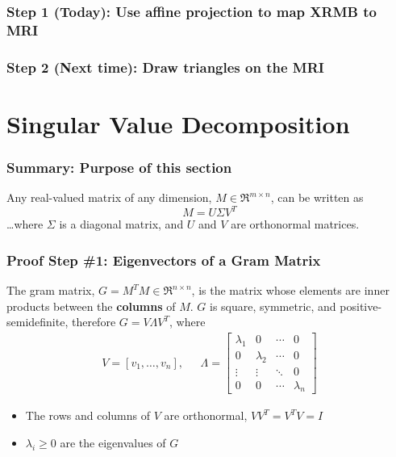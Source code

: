 \documentclass{beamer}
\begin{document}
\begin{frame}
  \frametitle{Step 1 (Today): Use affine projection to map XRMB to MRI}
  \centerline{}
\end{frame}

\begin{frame}
  \frametitle{Step 2 (Next time): Draw triangles on the MRI}
  \centerline{}
\end{frame}

\section{Singular Value Decomposition}
\setcounter{subsection}{1}

\begin{frame}
  \frametitle{Summary: Purpose of this section}

  Any real-valued matrix of any dimension, $M\in\Re^{m\times n}$, can
  be written as
  \[
  M = U\Sigma V^T
  \]
  \ldots where $\Sigma$ is a diagonal matrix, and $U$ and $V$ are
  orthonormal matrices.
\end{frame}

\begin{frame}
  \frametitle{Proof Step \#1: Eigenvectors of a Gram Matrix}

  The gram matrix, $G=M^TM\in\Re^{n\times n}$, is the matrix whose
  elements are inner products between the {\bf columns} of $M$.  $G$
  is square, symmetric, and positive-semidefinite, therefore
  $G=V\Lambda V^T$, where
  \begin{align*}
    V=\left[v_1,\ldots,v_n\right],~~~
    &\Lambda=\left[\begin{array}{cccc}\lambda_1&0&\cdots&0\\
        0&\lambda_2&\cdots&0\\\vdots&\vdots&\ddots&0\\
        0&0&\cdots&\lambda_n
      \end{array}\right]
  \end{align*}
  \begin{itemize}
  \item The rows and columns of $V$ are orthonormal, $VV^T=V^TV=I$
  \item $\lambda_i\ge 0$ are the eigenvalues of $G$
  \end{itemize}
\end{frame}
\end{document}
